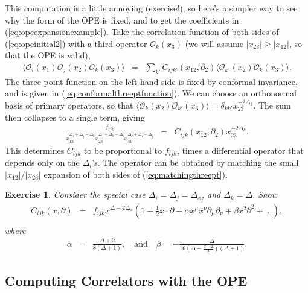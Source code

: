 \documentclass{ws-rv9x6}
\newcommand\be{\begin{eqnarray}}
\newcommand\ee{\end{eqnarray}}
\newcommand\f\phi
\newcommand\cO{\mathcal{O}}
\newcommand\p[1]{\left(#1\right)}
\newcommand\ptl\partial
\newcommand\<\langle
\renewcommand\>\rangle
\newcommand\de\delta
\newcommand\nn{\nonumber}
\renewcommand\.{\cdot}
\newcommand\De{\Delta}
\renewcommand\b\beta
\renewcommand\a\alpha
\newtheorem{exercise}{Exercise}[section]
\begin{document}
This computation is a little annoying (exercise!), so here's a simpler way to see why the form of the OPE is fixed, and to get the coefficients in (\ref{eq:opeexpansionexample}).  Take the correlation function of both sides of (\ref{eq:opeinitial2}) with a third operator $\cO_k(x_3)$ (we will assume $|x_{23}|\geq |x_{12}|$, so that the OPE is valid),
\be
\label{eq:threetotwo}
\<\cO_i(x_1)\cO_j(x_2)\cO_k(x_3)\> &=& \sum_{k'} C_{ijk'}(x_{12},\ptl_2)\<\cO_{k'}(x_2)\cO_k(x_3)\>.
\ee
The three-point function on the left-hand side is fixed by conformal invariance, and is given in  (\ref{eq:conformalthreeptfunction}). We can choose an orthonormal basis of primary operators, so that $\<\cO_k(x_2)\cO_{k'}(x_3)\>= \de_{kk'}x_{23}^{-2\De_k}$.  The sum then collapses to a single term, giving
\be
\label{eq:matchingthreept}
\frac{f_{ijk}}{x_{12}^{\De_i+\De_j-\De_k}x_{23}^{\De_j+\De_k-\De_i}x_{31}^{\De_k+\De_i-\De_j}} &=& C_{ijk}(x_{12},\ptl_2)x_{23}^{-2\De_k}.
\ee
This determines $C_{ijk}$ to be proportional to $f_{ijk}$, times a differential operator that depends only on the $\De_i$'s. The operator can be obtained by matching the small $|x_{12}|/|x_{23}|$ expansion of both sides of (\ref{eq:matchingthreept}).
\begin{exercise}
\label{exercise:seriesfordiffops}
Consider the special case $\De_i=\De_j=\De_\f$, and $\De_k=\De$.  Show
\be
\label{eq:identicalscalaropeoperator}
C_{ijk}(x,\ptl) &=& f_{ijk} x^{\De-2\De_\f}\p{1+\frac 1 2 x\.\ptl + \a x^\mu x^\nu\ptl_\mu\ptl_\nu + \b x^2 \ptl^2+\dots},\nn\\
\ee
where
\be
\label{eq:opedescendantcoefficients}
\a &=& \frac{\De+2}{8(\De+1)},\quad\textrm{and}\quad \b=-\frac{\De}{16(\De-\frac{d-2}{2})(\De+1)}.
\ee
\end{exercise}

\subsection{Computing Correlators with the OPE}
\end{document}
